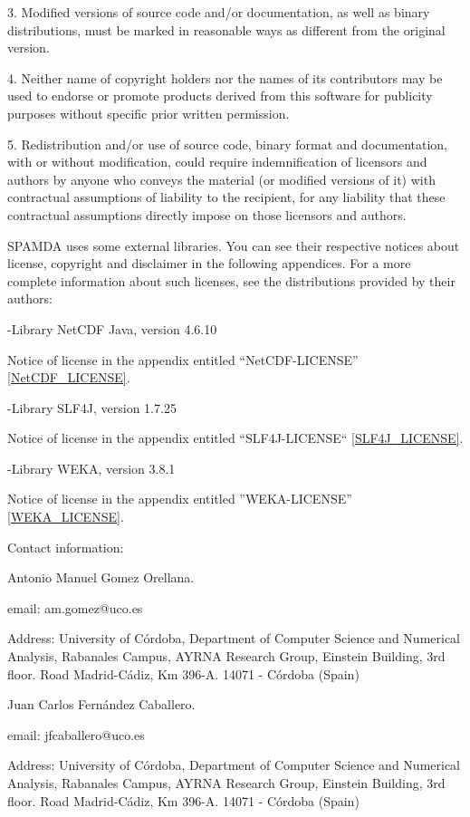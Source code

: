 3. Modified versions of source code and/or documentation, as well as binary
distributions, must be marked in reasonable ways as different from the original version.

4. Neither name of copyright holders nor the names of its contributors may be used
to endorse or promote products derived from this software for publicity purposes
without specific prior written permission.

5. Redistribution and/or use of source code, binary format and documentation,
with or without modification, could require indemnification of licensors
and authors by anyone who conveys the material (or modified versions of it)
with contractual assumptions of liability to the recipient, for any liability
that these contractual assumptions directly impose on those licensors and authors.

SPAMDA uses some external libraries. You can see their respective notices about license,
copyright and disclaimer in the following appendices. For a more complete information about
such licenses, see the distributions provided by their authors:

-Library NetCDF Java, version 4.6.10

\hspace{0.75cm}Notice of license in the appendix entitled ``NetCDF-LICENSE'' \ref{NetCDF_LICENSE}.

-Library SLF4J, version 1.7.25

\hspace{0.75cm}Notice of license in the appendix entitled ``SLF4J-LICENSE`` \ref{SLF4J_LICENSE}.

-Library WEKA, version 3.8.1

\hspace{0.75cm}Notice of license in the appendix entitled ''WEKA-LICENSE'' \ref{WEKA_LICENSE}.

\vspace{0.50cm}
Contact information:

Antonio Manuel Gomez Orellana.

email: am.gomez@uco.es

Address: University of Córdoba, Department of Computer Science and Numerical Analysis, Rabanales Campus, AYRNA Research Group, Einstein Building, 3rd floor. Road Madrid-Cádiz, Km 396-A. 14071 - Córdoba (Spain)

\vspace{0.50cm}

Juan Carlos Fernández Caballero.

email: jfcaballero@uco.es

Address: University of Córdoba, Department of Computer Science and Numerical Analysis, Rabanales Campus, AYRNA Research Group, Einstein Building, 3rd floor. Road Madrid-Cádiz, Km 396-A. 14071 - Córdoba (Spain)

